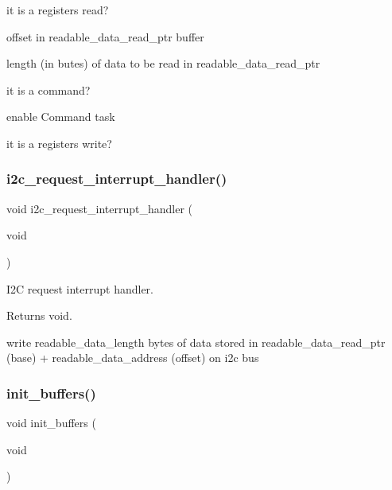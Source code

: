 it is a registers read?

offset in readable\+\_\+data\+\_\+read\+\_\+ptr buffer

length (in butes) of data to be read in readable\+\_\+data\+\_\+read\+\_\+ptr

it is a command?

enable Command task

it is a registers write? \mbox{\label{i2c-rain_8h_ac1da31566bf05976ecb87372278a1ea8}} 
\subsubsection{\texorpdfstring{i2c\+\_\+request\+\_\+interrupt\+\_\+handler()}{i2c\_request\_interrupt\_handler()}}
{\footnotesize\ttfamily void i2c\+\_\+request\+\_\+interrupt\+\_\+handler (\begin{DoxyParamCaption}\item[{void}]{ }\end{DoxyParamCaption})}



I2C request interrupt handler. 

\begin{DoxyReturn}{Returns}
void. 
\end{DoxyReturn}
write readable\+\_\+data\+\_\+length bytes of data stored in readable\+\_\+data\+\_\+read\+\_\+ptr (base) + readable\+\_\+data\+\_\+address (offset) on i2c bus \mbox{\label{i2c-rain_8h_ad438327c9cf783bd9c519ce8b8ef3bfa}} 
\subsubsection{\texorpdfstring{init\+\_\+buffers()}{init\_buffers()}}
{\footnotesize\ttfamily void init\+\_\+buffers (\begin{DoxyParamCaption}\item[{void}]{ }\end{DoxyParamCaption})}



